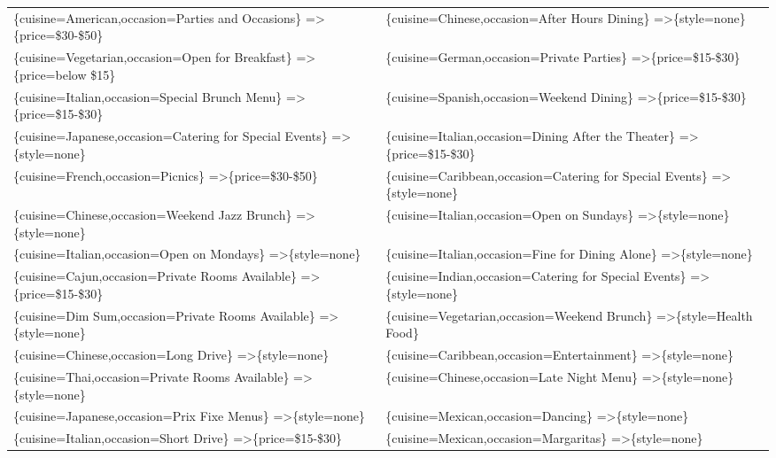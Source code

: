 \documentclass[letterpaper,10pt]{article}
\begin{document}
\begin{appendices}
\begin{table}[h]
\begin{adjustbox}{max width=\textwidth}
\begin{tabular}{ll}
\{cuisine=American,occasion=Parties and Occasions\} =\textgreater \{price=\$30-\$50\} & \{cuisine=Chinese,occasion=After Hours Dining\} =\textgreater \{style=none\} \\ 
\{cuisine=Vegetarian,occasion=Open for Breakfast\} =\textgreater \{price=below \$15\} & \{cuisine=German,occasion=Private Parties\} =\textgreater \{price=\$15-\$30\} \\ 
\{cuisine=Italian,occasion=Special Brunch Menu\} =\textgreater \{price=\$15-\$30\} & \{cuisine=Spanish,occasion=Weekend Dining\} =\textgreater \{price=\$15-\$30\} \\ 
\{cuisine=Japanese,occasion=Catering for Special Events\} =\textgreater \{style=none\} & \{cuisine=Italian,occasion=Dining After the Theater\} =\textgreater \{price=\$15-\$30\} \\ 
\{cuisine=French,occasion=Picnics\} =\textgreater \{price=\$30-\$50\} & \{cuisine=Caribbean,occasion=Catering for Special Events\} =\textgreater \{style=none\} \\ 
\{cuisine=Chinese,occasion=Weekend Jazz Brunch\} =\textgreater \{style=none\} & \{cuisine=Italian,occasion=Open on Sundays\} =\textgreater \{style=none\} \\ 
\{cuisine=Italian,occasion=Open on Mondays\} =\textgreater \{style=none\} & \{cuisine=Italian,occasion=Fine for Dining Alone\} =\textgreater \{style=none\} \\ 
\{cuisine=Cajun,occasion=Private Rooms Available\} =\textgreater \{price=\$15-\$30\} & \{cuisine=Indian,occasion=Catering for Special Events\} =\textgreater \{style=none\} \\ 
\{cuisine=Dim Sum,occasion=Private Rooms Available\} =\textgreater \{style=none\} & \{cuisine=Vegetarian,occasion=Weekend Brunch\} =\textgreater \{style=Health Food\} \\ 
\{cuisine=Chinese,occasion=Long Drive\} =\textgreater \{style=none\} & \{cuisine=Caribbean,occasion=Entertainment\} =\textgreater \{style=none\} \\ 
\{cuisine=Thai,occasion=Private Rooms Available\} =\textgreater \{style=none\} & \{cuisine=Chinese,occasion=Late Night Menu\} =\textgreater \{style=none\} \\ 
\{cuisine=Japanese,occasion=Prix Fixe Menus\} =\textgreater \{style=none\} & \{cuisine=Mexican,occasion=Dancing\} =\textgreater \{style=none\} \\ 
\{cuisine=Italian,occasion=Short Drive\} =\textgreater \{price=\$15-\$30\} & \{cuisine=Mexican,occasion=Margaritas\} =\textgreater \{style=none\} \\ 

\end{tabular}
\end{adjustbox}
\end{table}
\end{appendices}
\end{document}
